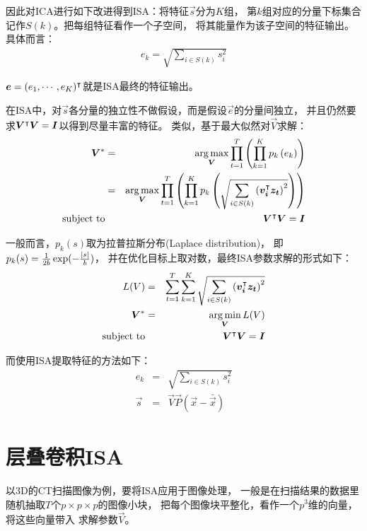 因此对ICA进行如下改进得到ISA：将特征$\vec{s}$分为$K$组，
第$k$组对应的分量下标集合记作$S(k)$。把每组特征看作一个子空间，
将其能量作为该子空间的特征输出。具体而言：
\begin{eqnarray}
    e_k = \sqrt{\sum_{i\in S(k)} s_i^2}
    \label{eqn:isa:0}
\end{eqnarray}

$\boldsymbol{e} = (e_1,\cdots,e_K)^\intercal$就是ISA最终的特征输出。

在ISA中，对$\vec{s}$各分量的独立性不做假设，而是假设$\vec{e}$的分量间独立，
并且仍然要求$\boldsymbol{V}^\intercal\boldsymbol{V}=\boldsymbol{I}$以得到尽量丰富的特征。
类似，基于最大似然对$\vec{V}$求解：
\begin{eqnarray}
    \vec{V}^* &=& \argmax_{\vec{V}}
            \prod_{t=1}^T \left(
            \prod_{k=1}^K\prob[k]{e_k} \right) \nonumber \\
        &=& \argmax_{\vec{V}}
            \prod_{t=1}^T \left(
            \prod_{k=1}^K\prob[k]{\sqrt{
                \sum_{i\in S(k)}\left(\trans{\vec{v_i}}\vec{z_t}\right)^2}
            }\right) \nonumber \\
        \text{subject to} && \trans{\vec{V}}\vec{V}=\vec{I}
    \label{eqn:isa:1}
\end{eqnarray}

一般而言，$p_k(s)$取为拉普拉斯分布(Laplace distribution)，
即$p_k(s) = \frac{1}{2b}\exp(-\frac{\left|s\right|}{b})$，
并在优化目标上取对数，最终ISA参数求解的形式如下：
\begin{eqnarray}
    L(V) &=& \sum_{t=1}^T \sum_{k=1}^K
        \sqrt{\sum_{i\in S(k)}\left(\trans{\vec{v_i}}\vec{z_t}\right)^2}
        \nonumber \\
    \vec{V}^* &=& \argmin_{\vec{V}} L(V) \nonumber \\
        \text{subject to} && \trans{\vec{V}}\vec{V}=\vec{I}
    \label{eqn:isa:opt}
\end{eqnarray}

而使用ISA提取特征的方法如下：
\begin{eqnarray}
    e_k &=&  \sqrt{\sum_{i\in S(k)} s_i^2} \nonumber \\
    \vec{s} &=& \vec{V}\vec{P}(\vec{x} - \bar{\vec{x}})
    \label{eqn:isa:extract}
\end{eqnarray}


\section{层叠卷积ISA\label{sec:isa:stacked-convolutional}}
以3D的CT扫描图像为例，要将ISA应用于图像处理，
一般是在扫描结果的数据里随机抽取$T$个$p\times p \times p$的图像小块，
把每个图像块平整化，看作一个$p^3$维的向量，将这些向量带入
求解参数$\vec{V}$。

